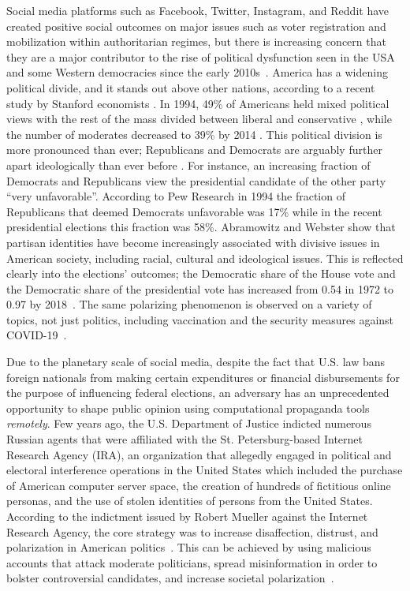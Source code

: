 Social media platforms such as Facebook, Twitter, Instagram, and Reddit have created positive social outcomes on major issues such as voter registration and mobilization within authoritarian regimes, but there is increasing concern that they are a major contributor to the rise of political dysfunction seen in the USA and some Western democracies since the early 2010s~\cite{haidt2019dark,mcnamee2020zucked}.   America has a widening political divide, and it stands out above other nations, according to a recent study by Stanford economists \cite{boxell2020cross}.  In 1994,  49\% of Americans held mixed political views with the rest of the mass divided between liberal and conservative \cite{pew2}, while the number of moderates  decreased to 39\% by 2014 \cite{bbc}. This political division is more pronounced than ever; Republicans and Democrats are arguably further apart ideologically than ever  before \cite{nytimes,bbc2,pew1}. For instance, an increasing fraction of Democrats and Republicans view the presidential candidate of the other party ``very unfavorable''. According to Pew Research in 1994 the fraction of  Republicans  that deemed  Democrats unfavorable was 17\% while in the recent presidential elections this fraction was 58\%. Abramowitz  and Webster show that partisan identities have become increasingly associated with divisive issues  in American society, including racial, cultural and ideological issues. This is reflected clearly into the elections' outcomes; the Democratic share of the House vote and the Democratic share of the presidential vote has increased from 0.54 in 1972 to 0.97 by 2018~\cite{abramowitz2015all}. 
 The same polarizing phenomenon is observed on a variety of topics, not just politics, including vaccination and the security measures against COVID-19~\cite{klein2020we,smith2019mapping}.  

Due to the planetary scale of social media, despite the fact that U.S. law bans foreign nationals from making certain expenditures or financial disbursements for the purpose of influencing federal elections, an adversary  has an unprecedented opportunity to shape public opinion using computational propaganda tools {\it remotely}. Few years ago,  the U.S. Department of Justice indicted numerous Russian agents that were  affiliated with the St. Petersburg-based Internet Research Agency (IRA), an organization that allegedly engaged in political and electoral interference operations in the United States which included the purchase of American computer server space, the creation of hundreds of fictitious online personas, and the use of stolen identities of persons from the United States.  According to the indictment issued by Robert Mueller against the Internet Research
Agency, the core strategy was to increase disaffection, distrust, and polarization in American politics~\cite{usjustice}. This can be achieved by using malicious accounts that attack moderate politicians, spread  misinformation in order to bolster controversial candidates, and increase societal polarization~\cite{allcott2017social,rolling}. 

